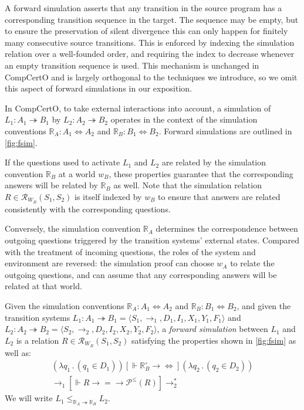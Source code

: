 \documentclass[sigplan,screen,review]{acmart}
\newcommand{\ifr}[1]{\mathrel{[{#1}]}}
\newcommand{\que}{\circ}
\begin{document}
A forward simulation asserts that any transition in the source program
has a corresponding transition sequence in the target.
The sequence may be empty,
but to ensure the preservation of silent divergence
this can only happen for finitely many consecutive source transitions.
This is enforced by indexing the simulation relation
over a well-founded order,
and requiring the index to decrease
whenever an empty transition sequence is used.
This mechanism is unchanged in CompCertO
and is largely orthogonal to the techniques we introduce,
so we omit this aspect of forward simulations
in our exposition.

In CompCertO,
to take 
external interactions into account,
a simulation of
$L_1 : A_1 \twoheadrightarrow B_1$ by
$L_2 : A_2 \twoheadrightarrow B_2$
operates in the context of the simulation conventions
$\mathbb{R}_A : A_1 \Leftrightarrow A_2$ and
$\mathbb{R}_B : B_1 \Leftrightarrow B_2$.
Forward simulations
are outlined in \autoref{fig:fsim}.

If the questions %
used to activate $L_1$ and $L_2$
are related by the simulation convention $\mathbb{R}_B$
at a world $w_B$,
these properties guarantee that the corresponding answers will be related
by $\mathbb{R}_B$ as well.
Note that
the simulation relation $R \in \mathcal{R}_{W_B}(S_1, S_2)$
is itself indexed by $w_B$
to ensure that answers
are related consistently with the corresponding questions.

Conversely,
the simulation convention $\mathbb{R}_A$
determines the correspondence between
outgoing questions triggered by
the transition systems' external states.
Compared with the treatment of incoming questions,
the roles of the system and environment are reversed:
the simulation proof can choose $w_A$
to relate the outgoing questions,
and can assume that any corresponding answers
will be related at that world.

\begin{definition} \label{def:fsim} %
Given
the simulation conventions
$\mathbb{R}_A : A_1 \Leftrightarrow A_2$ and
$\mathbb{R}_B : B_1 \Leftrightarrow B_2$,
and given
the transition systems
$L_1 : A_1 \twoheadrightarrow B_1 = \langle S_1, {\rightarrow}_1, D_1, I_1, X_1, Y_1, F_1 \rangle$ and
$L_2 : A_2 \twoheadrightarrow B_2 = \langle S_2, {\rightarrow}_2, D_2, I_2, X_2, Y_2, F_2 \rangle$,
a \emph{forward simulation} between $L_1$ and $L_2$
is a relation
$R \in \mathcal{R}_{W_B}(S_1, S_2)$
satisfying the properties shown in
\autoref{fig:fsim}
as well as:
\begin{gather*}
  (\lambda q_1 \, . \, (q_1 \in D_1))
  \ifr{\Vdash \mathbb{R}_B^\que \rightarrow {\Leftrightarrow}}
  (\lambda q_2 \, . \, (q_2 \in D_2))
  \\
  {\rightarrow_1}
  \ifr{\Vdash R \rightarrow {=} \rightarrow \mathcal{P}^\le(R)}
  {\rightarrow_2^*}
\end{gather*}
We will write $L_1 \le_{\mathbb{R}_A \twoheadrightarrow \mathbb{R}_B} L_2$.
\end{definition}
\end{document}
